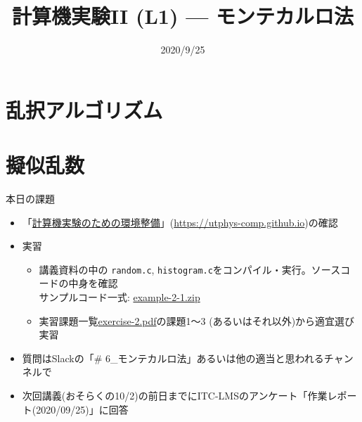 \documentclass[10pt,dvipdfmx]{beamer}
\title{計算機実験II (L1) --- モンテカルロ法}
\date{2020/9/25}
\begin{document}
\begin{frame}
  \titlepage
  \tableofcontents
\end{frame}






\section{乱択アルゴリズム}






%
\section{擬似乱数}









\begin{frame}[t]{本日の課題}
  \begin{itemize}
  \item 「\href{https://utphys-comp.github.io}{計算機実験のための環境整備}」({\small \href{https://utphys-comp.github.io}{https://utphys-comp.github.io}})の確認
  \item 実習
    \begin{itemize}
    \item 講義資料の中の {\tt random.c}, {\tt histogram.c}をコンパイル・実行。ソースコードの中身を確認 \\
      サンプルコード一式: \href{https://github.com/todo-group/ComputerExperiments/releases/tag/2020a-computer2}{example-2-1.zip}
    \item 実習課題一覧\href{https://github.com/todo-group/ComputerExperiments/releases/tag/2020a-computer2}{exercise-2.pdf}の課題1〜3 (あるいはそれ以外)から適宜選び実習
    \end{itemize}
  \item 質問はSlackの「\# 6\_モンテカルロ法」あるいは他の適当と思われるチャンネルで
  \item 次回講義(おそらくの10/2)の前日までにITC-LMSのアンケート「作業レポート(2020/09/25)」に回答
  \end{itemize}
\end{frame}
\end{document}

